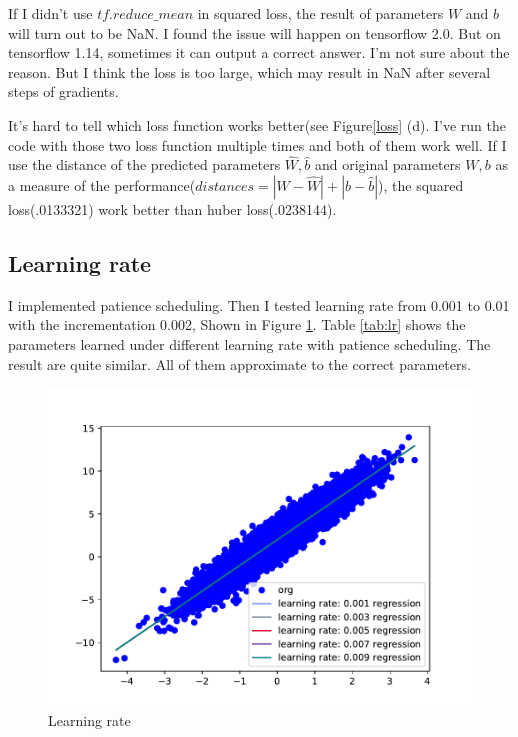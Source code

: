 \documentclass{article}
\begin{document}
If I didn't use $tf.reduce\_mean$ in squared loss, the result of parameters $W$ and $b$ will turn out to be NaN. I found the issue will happen on tensorflow 2.0. But on tensorflow 1.14, sometimes it can output a correct answer. I'm not sure about the reason. But I think the loss is too large, which may result in NaN after several steps of gradients. 

It's hard to tell which loss function works better(see Figure\ref{loss} (d). I've run the code with those two loss function multiple times and both of them work well. If I use the distance of the predicted parameters $\hat{W}, \hat{b}$ and original parameters $W, b$ as a measure of the performance($distances = |W-\hat{W}| + |b-\hat{b}|$), the squared loss(.0133321) work better than huber loss(.0238144).


\subsection{Learning rate}

I implemented patience scheduling. Then I tested learning rate from 0.001 to 0.01 with the incrementation 0.002, Shown in Figure \ref{lr}. Table \ref{tab:lr} shows the parameters learned under different learning rate with patience scheduling. The result are quite similar. All of them approximate to the correct parameters. 

\begin{figure}
  \centering
  \includegraphics[scale=0.5]{imgs/lr.pdf}
  \caption{Learning rate}
  \label{lr}
\end{figure}
\end{document}
